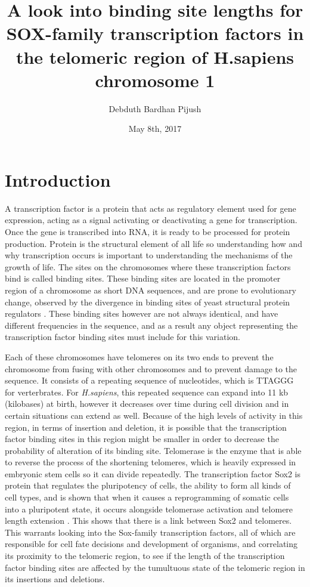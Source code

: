 \documentclass[12pt, a4paper]{article}
\begin{document}
\title{A look into binding site lengths for SOX-family transcription factors in the telomeric region of H.sapiens chromosome 1}
\author{Debduth Bardhan Pijush}
\date{May 8th, 2017}
\maketitle

\section{Introduction}
A transcription factor is a protein that acts as regulatory element used for gene expression, acting as a signal activating or deactivating a gene for transcription. Once the gene is transcribed into RNA, it is ready to be processed for protein production. Protein is the structural element of all life so understanding how and why transcription occurs is important to understanding the mechanisms of the growth of life. The sites on the chromosomes where these transcription factors bind is called binding sites. These binding sites are located in the promoter region of a chromosome as short DNA sequences, and are prone to evolutionary change, observed by the divergence in binding sites of yeast structural protein regulators \cite{evolution}. These binding sites however are not always identical, and have different frequencies in the sequence, and as a result any object representing the transcription factor binding sites must include for this variation.\newline

Each of these chromosomes have telomeres on its two ends to prevent the chromosome from fusing with other chromosomes and to prevent damage to the sequence. It consists of a repeating sequence of nucleotides, which is TTAGGG for verterbrates. For \textit{H.sapiens}, this repeated sequence can expand into 11 kb (kilobases) at birth, however it decreases over time during cell division and in certain situations can extend as well. Because of the high levels of activity in this region, in terms of insertion and deletion, it is possible that the transcription factor binding sites in this region might be smaller in order to decrease the probability of alteration of its binding site. Telomerase is the enzyme that is able to reverse the process of the shortening telomeres, which is heavily expressed in embryonic stem cells so it can divide repeatedly. The transcription factor Sox2 is protein that regulates the pluripotency of cells, the ability to form all kinds of cell types, and is shown that when it causes a reprogramming of somatic cells into a pluripotent state, it occurs alongside telomerase activation and telomere length extension \cite{telomere}. This shows that there is a link between Sox2 and telomeres. This warrants looking into the Sox-family transcription factors, all of which are responsible for cell fate decisions and development of organisms, and correlating its proximity to the telomeric region, to see if the length of the transcription factor binding sites are affected by the tumultuous state of the telomeric region in its insertions and deletions.
\end{document}
